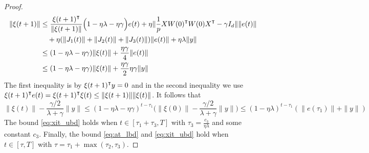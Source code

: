 \begin{proof}
\begin{equation*}   
\begin{aligned}
\|\xi(t+1)\| 
&\leq \frac{\xi(t+1)\transpose}{\|\xi(t+1)\|}\Big(1-\eta\lambda-\eta\gamma\Big)e(t) + \eta\|\frac{1}{p}XW(0)\transpose W(0)X\transpose-\gamma I_d\|\|e(t)\|\\
&\quad+\eta(\|J_1(t)\|+\|J_2(t)\|+\|J_3(t)\|)\|e(t)\| +\eta\lambda\|y\|  \\
&\leq (1-\eta\lambda-\eta\gamma)\|\xi(t)\|+ \frac{\eta\gamma}{4}\|e(t)\| \\
&\leq (1-\eta\lambda-\eta\gamma)\|\xi(t)\|+ \frac{\eta\gamma}{2}\eta\gamma\|y\|
\end{aligned}
\end{equation*} 
The first inequality is by $\xi(t+1)\transpose y =0$ and in the second inequality we use $\xi(t+1)\transpose e(t) = \xi(t+1)\transpose\xi(t) \leq \|\xi(t+1)\|\|\xi(t)\|$. It follows that
\begin{equation*}
\|\xi(t)\|-\frac{\gamma/2}{\lambda+\gamma}\|y\|\leq (1-\eta\lambda-\eta\gamma)^{t-\tau_1}\Big(\|\xi(0)\|-\frac{\gamma/2}{\lambda+\gamma}\|y\|\Big)\leq (1-\eta\lambda)^{t-\tau_1}(\|e(\tau_1)\|+\|y\|)
\end{equation*}
The bound \eqref{eq:xit_ubd} holds when $t\in [\tau_1+\tau_3,T]$ with $\tau_3 = \frac{c_3}{\eta\lambda}$ and some constant $c_3$. Finally, the bound \eqref{eq:at_lbd} and \eqref{eq:xit_ubd} hold when $t\in[\tau,T]$ with $\tau = \tau_1 + \max(\tau_2,\tau_3)$.
\end{proof}



